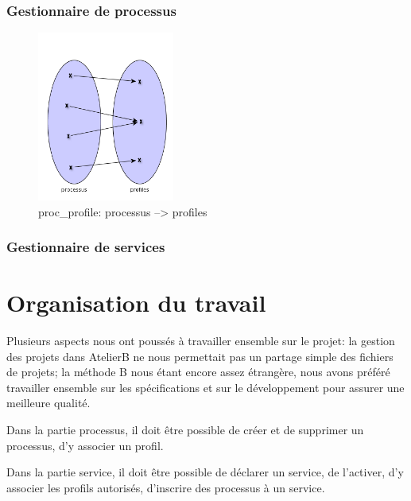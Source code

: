 \documentclass[french, 11pt, a4paper]{article}
\begin{document}
\subsubsection{Gestionnaire de processus}

\begin{figure}[htb]
  \centering
  \includegraphics[width=0.4\textwidth]{proc_profile.png}
  \caption{proc_profile: processus --> profiles}
  \label{fig:proc_profile}
\end{figure}

\subsubsection{Gestionnaire de services}

\section{Organisation du travail}
Plusieurs aspects nous ont poussés à travailler ensemble sur le projet: la
gestion des projets dans AtelierB ne nous permettait pas un partage simple des
fichiers de projets; la méthode B nous étant encore assez étrangère, nous avons
préféré travailler ensemble sur les spécifications et sur le développement pour
assurer une meilleure qualité.

Dans la partie processus, il doit être possible de créer et de supprimer un
processus, d'y associer un profil.

Dans la partie service, il doit être possible de déclarer un service, de
l'activer, d'y associer les profils autorisés, d'inscrire des processus à un
service.
\end{document}
